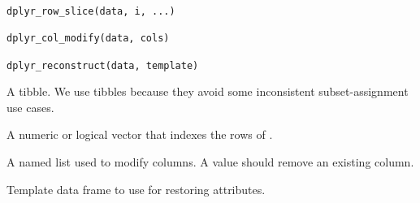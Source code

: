 \documentclass[a4paper]{book}
\begin{document}
%
\begin{Usage}
\begin{verbatim}
dplyr_row_slice(data, i, ...)

dplyr_col_modify(data, cols)

dplyr_reconstruct(data, template)
\end{verbatim}
\end{Usage}
%
\begin{Arguments}
\begin{ldescription}
\item[\code{data}] A tibble. We use tibbles because they avoid some inconsistent
subset-assignment use cases.

\item[\code{i}] A numeric or logical vector that indexes the rows of .

\item[\code{cols}] A named list used to modify columns. A  value should remove
an existing column.

\item[\code{template}] Template data frame to use for restoring attributes.
\end{ldescription}
\end{Arguments}
%
\end{document}
